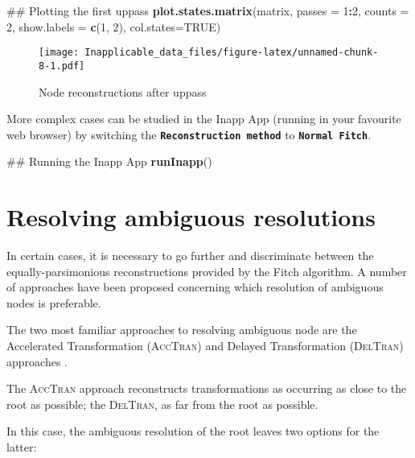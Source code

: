\documentclass[]{book}
\newenvironment{Shaded}{\begin{snugshade}}{\end{snugshade}}
\newcommand{\KeywordTok}[1]{\textcolor[rgb]{0.13,0.29,0.53}{\textbf{#1}}}
\newcommand{\DataTypeTok}[1]{\textcolor[rgb]{0.13,0.29,0.53}{#1}}
\newcommand{\DecValTok}[1]{\textcolor[rgb]{0.00,0.00,0.81}{#1}}
\newcommand{\OtherTok}[1]{\textcolor[rgb]{0.56,0.35,0.01}{#1}}
\newcommand{\OperatorTok}[1]{\textcolor[rgb]{0.81,0.36,0.00}{\textbf{#1}}}
\newcommand{\NormalTok}[1]{#1}
\theoremstyle{definition}
\theoremstyle{definition}
\theoremstyle{definition}
\theoremstyle{remark}
\begin{document}
\begin{Shaded}
\begin{Highlighting}[]
\NormalTok{## Plotting the first uppass}
\KeywordTok{plot.states.matrix}\NormalTok{(matrix, }\DataTypeTok{passes =} \DecValTok{1}\OperatorTok{:}\DecValTok{2}\NormalTok{, }\DataTypeTok{counts =} \DecValTok{2}\NormalTok{,}
                   \DataTypeTok{show.labels =} \KeywordTok{c}\NormalTok{(}\DecValTok{1}\NormalTok{, }\DecValTok{2}\NormalTok{), }\DataTypeTok{col.states=}\OtherTok{TRUE}\NormalTok{)}
\end{Highlighting}
\end{Shaded}

\begin{figure}
\centering
\texttt{[image: Inapplicable\_data\_files/figure-latex/unnamed-chunk-8-1.pdf]}
\caption{\label{fig:unnamed-chunk-8}Node reconstructions after uppass}
\end{figure}

More complex cases can be studied in the Inapp App (running in your
favourite web browser) by switching the
\textbf{\texttt{Reconstruction\ method}} to
\textbf{\texttt{Normal\ Fitch}}.

\begin{Shaded}
\begin{Highlighting}[]
\NormalTok{## Running the Inapp App}
\KeywordTok{runInapp}\NormalTok{()}
\end{Highlighting}
\end{Shaded}

\section{Resolving ambiguous
resolutions}\label{resolving-ambiguous-resolutions}

In certain cases, it is necessary to go further and discriminate between
the equally-parsimonious reconstructions provided by the Fitch
algorithm. A number of approaches have been proposed concerning which
resolution of ambiguous nodes is preferable.

The two most familiar approaches to resolving ambiguous node are the
Accelerated Transformation (\textsc{AccTran}) and Delayed Transformation
(\textsc{DelTran}) approaches \citep{Farris1970, Swofford1987}.

The \textsc{AccTran} approach reconstructs transformations as occurring
as close to the root as possible; the \textsc{DelTran}, as far from the
root as possible.

In this case, the ambiguous resolution of the root leaves two options
for the latter:
\end{document}
